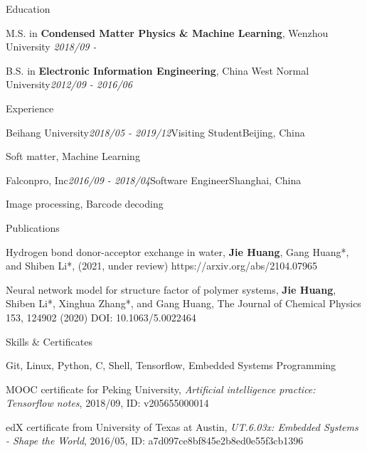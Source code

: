 \documentclass{resume} %
\begin{document}
\begin{rSection}{Education}
\begin{rSubsection}{}{}{}{}
\item M.S. in \textbf{Condensed Matter Physics \& Machine Learning}, Wenzhou University \hfill \textit{2018/09 -}
\item B.S. in \textbf{Electronic Information Engineering}, China West Normal University\hfill \textit{2012/09 - 2016/06}
\end{rSubsection}
\end{rSection}


\begin{rSection}{Experience}
\begin{rSubsection}{Beihang University}{\em 2018/05 - 2019/12}{Visiting Student}{Beijing, China}
\item Soft matter, Machine Learning 
\end{rSubsection}

\begin{rSubsection}{Falconpro, Inc}{\em 2016/09 - 2018/04}{Software Engineer}{Shanghai, China}
	\item Image processing, Barcode decoding
\end{rSubsection}
\end{rSection}



\begin{rSection}{Publications}
\begin{rSubsection}{}{}{}{}
\item Hydrogen bond donor-acceptor exchange in water, \textbf{Jie Huang}, Gang Huang*, and Shiben Li*, (2021, under review) https://arxiv.org/abs/2104.07965
\item Neural network model for structure factor of polymer systems, \textbf{Jie Huang}, Shiben Li*, Xinghua Zhang*, and Gang Huang, The Journal of Chemical Physics 153, 124902 (2020) DOI: 10.1063/5.0022464
\end{rSubsection}
\end{rSection}



\begin{rSection}{Skills \& Certificates}
\begin{rSubsection}{}{}{}{}
	\item Git, Linux, Python, C, Shell, Tensorflow, Embedded Systems Programming 
	\item MOOC certificate for Peking University, \textit{Artificial intelligence practice: Tensorflow notes}, 2018/09, ID: v205655000014
	\item edX certificate from University of Texas at Austin, \textit{UT.6.03x: Embedded Systems - Shape the World}, 2016/05, 
	 ID: a7d097ce8bf845e2b8ed0e55f3cb1396
\end{rSubsection}
\end{rSection}
\end{document}

